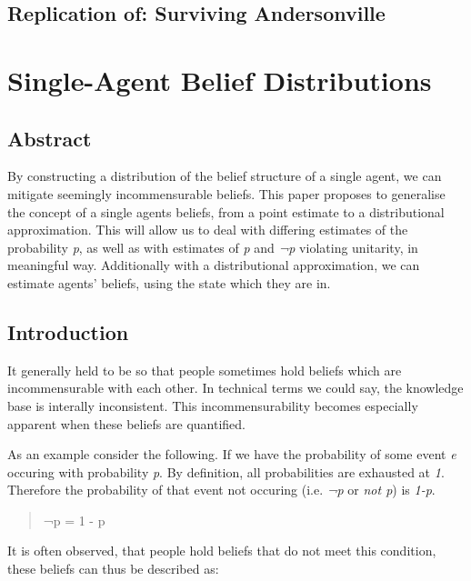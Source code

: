 \documentclass[a4paper]{book}\usepackage{graphicx, color}
\begin{document}
\begin{refsection}
\chapter{Replication of: Surviving Andersonville}

\printbibliography
\end{refsection}

\chapter{Single-Agent Belief Distributions}

\section*{Abstract}
By constructing a distribution of the belief structure of a single
agent, we can mitigate seemingly incommensurable beliefs. This paper
proposes to generalise the concept of a single agents beliefs, from a
point estimate to a distributional approximation. This will allow us to
deal with differing estimates of the probability \emph{p}, as well as
with estimates of \emph{p} and \emph{¬p} violating unitarity, in
meaningful way. Additionally with a distributional approximation, we can
estimate agents' beliefs, using the state which they are in.

\section{Introduction}

It generally held to be so that people sometimes hold beliefs which are
incommensurable with each other. In technical terms we could say, the
knowledge base is interally inconsistent. This incommensurability
becomes especially apparent when these beliefs are quantified.

As an example consider the following. If we have the probability of some
event \emph{e} occuring with probability \emph{p}. By definition, all
probabilities are exhausted at \emph{1}. Therefore the probability of
that event not occuring (i.e. \emph{¬p} or \emph{not p}) is \emph{1-p}.

\begin{quote}
¬p = 1 - p
\end{quote}

It is often observed, that people hold beliefs that do not meet this
condition, these beliefs can thus be described as:
\end{document}
